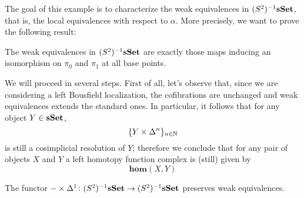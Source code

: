 \begin{refsection}
The goal of this example is to characterize the weak equivalences in $(S^2)^{-1} \mathbf{s\,\!\mathbf{Set}}$, that is, the local equivalences with respect to $\alpha$. More precisely, we want to prove the following result:

\begin{prop} \label{prop S^2 nullification}
The weak equivalences in $(S^2)^{-1} \mathbf{s\,\!\mathbf{Set}}$ are exactly those maps inducing an isomorphism on $\pi_0$ and $\pi_1$ at all base points.
\end{prop}

We will proceed in several steps. First of all, let's observe that, since we are considering a left Bousfield localization, the cofibrations are unchanged and weak equivalences extends the standard ones. In particular, it follows that for any object $Y \in \mathbf{s\,\!\mathbf{Set}}$,
\[
\{Y \times \Delta^n\}_{n \in \mathbb{N}}
\]
is still a cosimplicial resolution of $Y$; therefore we conclude that for any pair of objects $X$ and $Y$ a left homotopy function complex is (still) given by
\[
\mathbf{hom}(X,Y)
\]

\begin{lemma} \label{lemma S^2 nullification 1}
The functor $- \times \Delta^1 \colon (S^2)^{-1} \mathbf{s\,\!\mathbf{Set}} \to (S^2)^{-1} \mathbf{s\,\!\mathbf{Set}}$ preserves weak equivalences.
\end{lemma}


\end{refsection}

